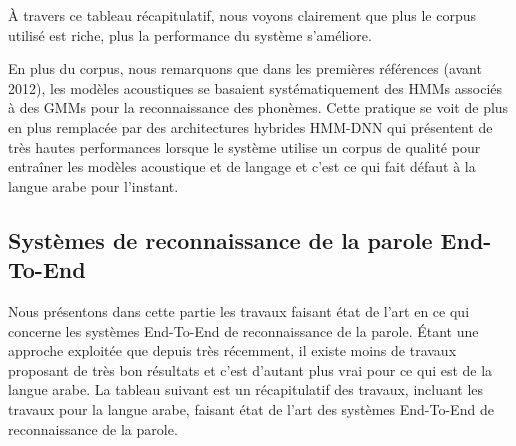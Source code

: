 \FloatBarrier

À travers ce tableau récapitulatif, nous voyons clairement que plus le corpus utilisé est riche, plus la performance du système s'améliore.

En plus du corpus, nous remarquons que dans les premières références (avant 2012), les modèles acoustiques se basaient systématiquement des HMMs associés à des GMMs pour la reconnaissance des phonèmes. Cette pratique se voit de plus en plus remplacée par des architectures hybrides HMM-DNN qui présentent de très hautes performances lorsque le système utilise un corpus de qualité pour entraîner les modèles acoustique et de langage et c'est ce qui fait défaut à la langue arabe pour l'instant.

\subsection{Systèmes de reconnaissance de la parole End-To-End}\label{statearte2e}
Nous présentons dans cette partie les travaux faisant état de l'art en ce qui concerne les systèmes End-To-End de reconnaissance de la parole. Étant une approche exploitée que depuis très récemment, il existe moins de travaux proposant de très bon résultats et c'est d'autant plus vrai pour ce qui est de la langue arabe. La tableau suivant est un récapitulatif des travaux, incluant les travaux pour la langue arabe, faisant état de l'art des systèmes End-To-End de reconnaissance de la parole.

